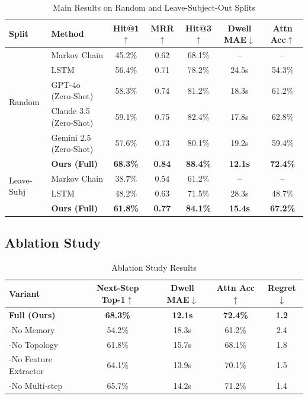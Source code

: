 \documentclass[letterpaper]{article}
\begin{document}
\begin{table}[h]
\centering
\caption{Main Results on Random and Leave-Subject-Out Splits}
\begin{tabular}{llccccc}
\toprule
Split & Method & Hit@1$\uparrow$ & MRR$\uparrow$ & Hit@3$\uparrow$ & Dwell MAE$\downarrow$ & Attn Acc$\uparrow$ \\
\midrule
\multirow{5}{*}{Random}
& Markov Chain & 45.2\% & 0.62 & 68.1\% & -- & -- \\
& LSTM & 56.4\% & 0.71 & 78.2\% & 24.5s & 54.3\% \\
& GPT-4o (Zero-Shot) & 58.3\% & 0.74 & 81.2\% & 18.3s & 61.2\% \\
& Claude 3.5 (Zero-Shot) & 59.1\% & 0.75 & 82.4\% & 17.8s & 62.8\% \\
& Gemini 2.5 (Zero-Shot) & 57.6\% & 0.73 & 80.1\% & 19.2s & 59.4\% \\
& \textbf{Ours (Full)} & \textbf{68.3\%} & \textbf{0.84} & \textbf{88.4\%} & \textbf{12.1s} & \textbf{72.4\%} \\
\midrule
\multirow{2}{*}{Leave-Subj}
& Markov Chain & 38.7\% & 0.54 & 61.2\% & -- & -- \\
& LSTM & 48.2\% & 0.63 & 71.5\% & 28.3s & 48.7\% \\
& \textbf{Ours (Full)} & \textbf{61.8\%} & \textbf{0.77} & \textbf{84.1\%} & \textbf{15.4s} & \textbf{67.2\%} \\
\bottomrule
\end{tabular}
\label{tab:main_results}
\end{table}

\subsection{Ablation Study}

\begin{table}[h]
\centering
\caption{Ablation Study Results}
\begin{tabular}{lcccc}
\toprule
Variant & Next-Step Top-1$\uparrow$ & Dwell MAE$\downarrow$ & Attn Acc$\uparrow$ & Regret$\downarrow$ \\
\midrule
\textbf{Full (Ours)} & \textbf{68.3\%} & \textbf{12.1s} & \textbf{72.4\%} & \textbf{1.2} \\
-No Memory & 54.2\% & 18.3s & 61.2\% & 2.4 \\
-No Topology & 61.8\% & 15.7s & 68.1\% & 1.8 \\
-No Feature Extractor & 64.1\% & 13.9s & 70.1\% & 1.5 \\
-No Multi-step & 65.7\% & 14.2s & 71.2\% & 1.4 \\
\bottomrule
\end{tabular}
\label{tab:ablation}
\end{table}
\end{document}
